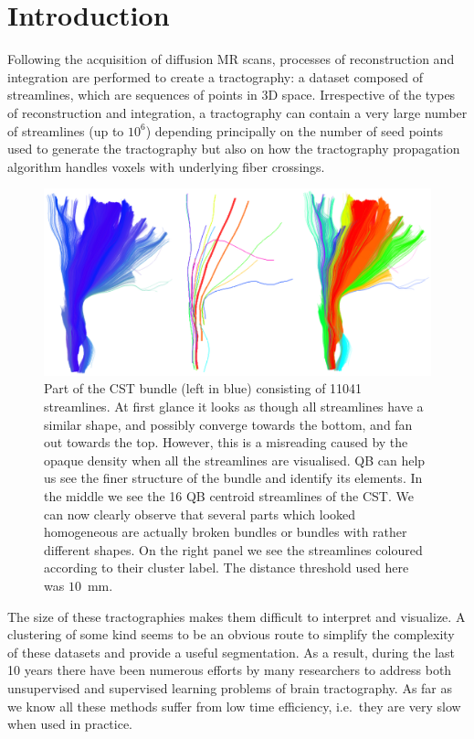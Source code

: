 \documentclass{bioinfo}
\begin{document}
\section{Introduction}

Following the acquisition of diffusion MR scans, processes of
reconstruction and integration are performed to create a tractography: a
dataset composed of streamlines, which are sequences of points in 3D
space. Irrespective of the types of reconstruction and integration, a
tractography can contain a very large number of streamlines (up to
$10^6$) depending principally on the number of seed points used to
generate the tractography but also on how the tractography propagation 
algorithm handles voxels with underlying fiber crossings.

\begin{figure}[htp]
\centerline{\includegraphics[width=160mm]{Figures/Fig_4_cst_simplification_relabeled_triple.eps}}
\caption{Part of the CST bundle (left in blue) consisting of \num{11041}
  streamlines. At first glance it looks as though all streamlines have a
  similar shape, and possibly converge towards the bottom, and fan out
  towards the top. However, this is a misreading caused by the opaque
  density when all the streamlines are visualised.  QB can help us see
  the finer structure of the bundle and identify its elements. In the
  middle we see the 16 QB centroid streamlines of the CST. We can now
  clearly observe that several parts which looked homogeneous are
  actually broken bundles or bundles with rather different shapes. On
  the right panel we see the streamlines coloured according to their
  cluster label. The distance threshold used here was
  $10$~mm. \label{Flo:cst_pbc}}
\end{figure}


The size of these tractographies makes them difficult to interpret and
visualize. A clustering of some kind seems to be an obvious route to
simplify the complexity of these datasets and provide a useful
segmentation. As a result, during the last 10 years there have been
numerous efforts by many researchers to address both unsupervised and
supervised learning problems of brain tractography.  As far as we know
all these methods suffer from low time efficiency, i.e.~they are very
slow when used in practice.
\end{document}
